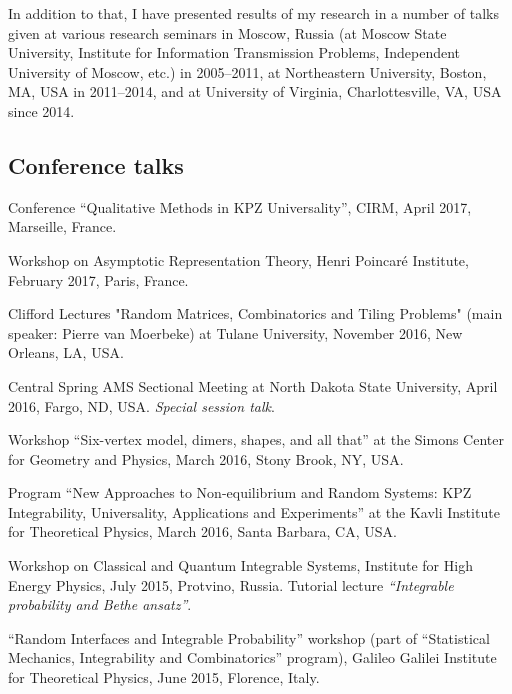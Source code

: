 \documentclass[letterpaper,11pt]{article}
\begin{document}
In addition to that, I have presented results of my research in a number of
talks given at various research seminars in Moscow, Russia (at Moscow State
University, Institute for Information Transmission Problems, Independent
University of Moscow, etc.) in 2005--2011, at Northeastern University, Boston,
MA, USA in 2011--2014, and
at University of Virginia, Charlottesville, VA, USA since 2014.

\subsection*{Conference talks}

\begin{etaremune}
	\item
	      Conference ``Qualitative Methods in KPZ Universality'', CIRM,
	      April 2017,
	      Marseille, France.

	\item
	      Workshop on Asymptotic Representation Theory, Henri Poincar\'e
	      Institute, February 2017, Paris, France.

	\item
	      Clifford Lectures
	      "Random Matrices, Combinatorics and Tiling Problems"
	      (main speaker: Pierre van Moerbeke) at Tulane University,
	      November 2016, New Orleans, LA, USA.

	\item
	      Central Spring AMS Sectional Meeting
	      at
	      North Dakota State University, April 2016,
	      Fargo, ND, USA. \emph{Special session talk}.

	\item
	      Workshop
	      ``Six-vertex model, dimers, shapes, and all that''
	      at the
	      Simons Center for Geometry and Physics,
	      March 2016, Stony Brook, NY, USA.

	\item
	      Program ``New Approaches to Non-equilibrium and Random Systems:
	      KPZ Integrability, Universality, Applications and Experiments''
	      at the Kavli Institute for Theoretical Physics,
	      March 2016, Santa Barbara, CA, USA.

	\item
	      Workshop on Classical and Quantum Integrable Systems,
	      Institute for High Energy Physics, July 2015, Protvino, Russia.
	      Tutorial lecture \emph{``Integrable probability and Bethe
		      ansatz''}.

	\item
	      ``Random Interfaces and Integrable Probability'' workshop (part
	      of
	      ``Statistical Mechanics, Integrability and Combinatorics''
	      program),
	      Galileo Galilei Institute for Theoretical Physics, June 2015,
	      Florence, Italy.


\end{etaremune}
\end{document}
